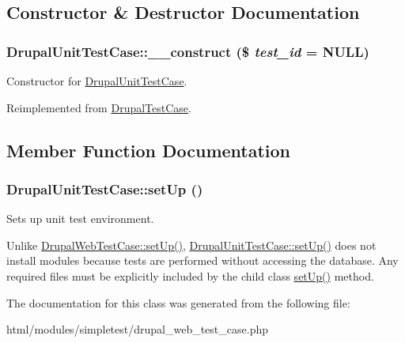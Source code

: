 \subsection{Constructor \& Destructor Documentation}
\hypertarget{classDrupalUnitTestCase_a90ea280099eab5b03f4584e04c2b38dc}{
\subsubsection[{\_\-\_\-construct}]{\setlength{\rightskip}{0pt plus 5cm}DrupalUnitTestCase::\_\-\_\-construct (\$ {\em test\_\-id} = {\ttfamily NULL})}}
\label{classDrupalUnitTestCase_a90ea280099eab5b03f4584e04c2b38dc}
Constructor for \hyperlink{classDrupalUnitTestCase}{DrupalUnitTestCase}. 

Reimplemented from \hyperlink{classDrupalTestCase_abb2516192da25b89bec5f5a4a7e91aab}{DrupalTestCase}.

\subsection{Member Function Documentation}
\hypertarget{classDrupalUnitTestCase_a120dccfa92782522c64da39aaa1d49ab}{
\subsubsection[{setUp}]{\setlength{\rightskip}{0pt plus 5cm}DrupalUnitTestCase::setUp ()}}
\label{classDrupalUnitTestCase_a120dccfa92782522c64da39aaa1d49ab}
Sets up unit test environment.

Unlike \hyperlink{classDrupalWebTestCase_a110ecf5deb57ee6a908617360c1f6ec4}{DrupalWebTestCase::setUp()}, \hyperlink{classDrupalUnitTestCase_a120dccfa92782522c64da39aaa1d49ab}{DrupalUnitTestCase::setUp()} does not install modules because tests are performed without accessing the database. Any required files must be explicitly included by the child class \hyperlink{classDrupalUnitTestCase_a120dccfa92782522c64da39aaa1d49ab}{setUp()} method. 

The documentation for this class was generated from the following file:\begin{DoxyCompactItemize}
\item 
html/modules/simpletest/drupal\_\-web\_\-test\_\-case.php\end{DoxyCompactItemize}
